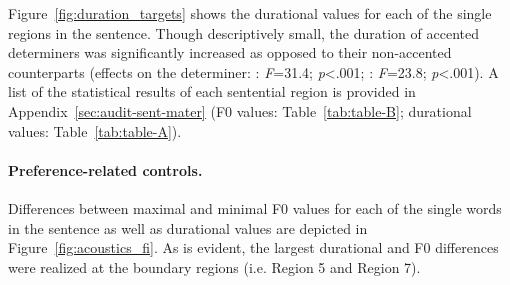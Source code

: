 \documentclass[fleqn,reqno,10pt]{article}
\begin{document}
Figure~\ref{fig:duration_targets} shows the durational values for each
of the single regions in the sentence.  Though descriptively small,
the duration of accented determiners was significantly increased as
opposed to their non-accented counterparts (effects on the determiner:
: \emph{F}=31.4; \emph{p}<.001; :
\emph{F}=23.8; \emph{p}<.001).  A list of the statistical results of
each sentential region is provided in
Appendix~\ref{sec:audit-sent-mater} (F0 values:
Table~\ref{tab:table-B}; durational values: Table~\ref{tab:table-A}).


\paragraph{Preference-related controls.} 
Differences between maximal and minimal F0 values for each of the
single words in the sentence as well as durational values are depicted in
Figure~\ref{fig:acoustics_fi}. As is
evident, the largest durational and F0 differences were
realized at the boundary regions (i.e. Region 5 and Region
7). 
\end{document}
